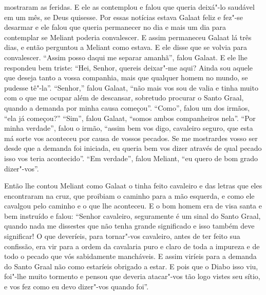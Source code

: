 mostraram as feridas. E ele as contemplou e falou que queria deixá"-lo saudável
em um mês, se Deus quisesse. Por essas notícias estava Galaat feliz e fez"-se
desarmar e ele falou que queria permanecer no dia e mais um dia para contemplar
se Meliant poderia convalescer. E assim permaneceu Galaat lá três dias, e então
perguntou a Meliant como estava. E ele disse que se volvia para convalescer.
“Assim posso daqui me separar amanhã”, falou Galaat. E ele lhe respondeu bem
triste: “Hei, Senhor, quereis deixar"-me aqui? Ainda sou aquele que deseja tanto
a vossa companhia, mais que qualquer homem no mundo, se pudesse tê"-la”.
“Senhor,” falou Galaat, “não mais vos sou de valia e tinha muito com o que me
ocupar além de descansar, sobretudo procurar o Santo Graal, quando a demanda
por minha causa começou”. “Como”, falou um dos irmãos, “ela já começou?”
“Sim”, falou Galaat, “somos ambos companheiros nela”. “Por minha verdade”,
falou o irmão, “assim bem vos digo, cavaleiro seguro, que esta má sorte vos
aconteceu por causa de vossos pecados. Se me mostrardes vosso ser desde que a
demanda foi iniciada, eu queria bem vos dizer através de qual pecado isso vos
teria acontecido”. “Em verdade”, falou Meliant, “eu quero de bom grado
dizer"-vos”. 

Então lhe contou Meliant como Galaat o tinha feito cavaleiro e das letras que
eles encontraram na cruz, que proibiam o caminho para a mão esquerda, e como
ele cavalgou pelo caminho e o que lhe aconteceu. E o bom homem era de visa
santa e bem instruído e falou: “Senhor cavaleiro, seguramente é um sinal do
Santo Graal, quando nada me dissestes que não tenha grande significado e isso
também deve significar! O que deveríeis, para tornar"-vos cavaleiro, antes de
ter feito sua confissão, era vir para a ordem da cavalaria puro e claro de toda
a impureza e de todo o pecado que vós sabidamente mancháveis. E assim viríeis
para a demanda do Santo Graal não como estaríeis obrigado a estar. E pois que o
Diabo isso viu, foi"-lhe muito tormento e pensou que deveria atacar"-vos tão logo
vistes seu sítio, e vos fez como eu devo dizer"-vos quando foi''.

